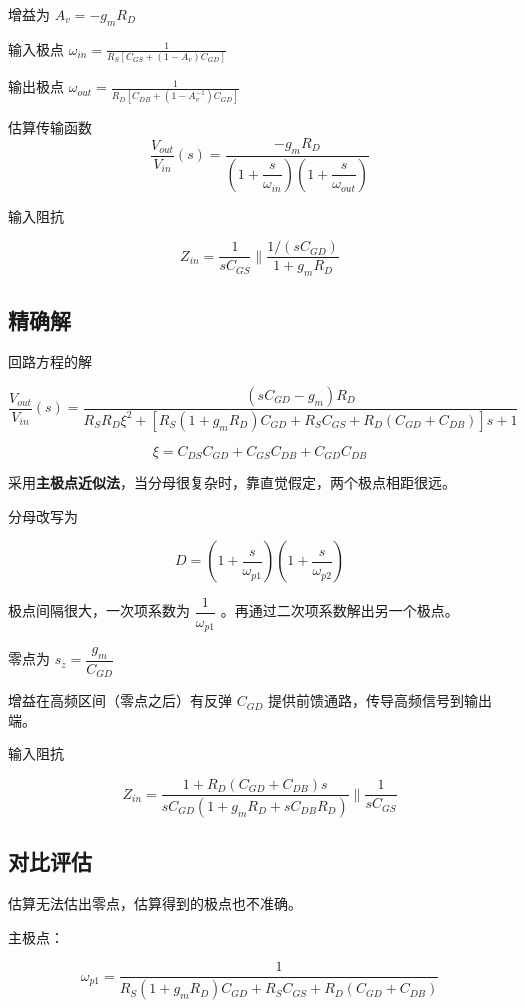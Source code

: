 \documentclass[cn,11pt,chinese,black,simple]{../elegantbook}
\begin{document}
增益为 \(A_v = - g_m R_D\) 

输入极点 \(\omega_{in} = \frac{1}{R_S [C_{GS} + (1 - A_v) C_{GD}]}\)

输出极点 \(\omega_{out} = \frac{1}{R_D [C_{DB} + (1 - A_v^{-1}) C_{GD}]}\)

估算传输函数 \[\frac{V_{out}}{V_{in}}(s) = \frac{-g_m R_D}{(1 + \dfrac{s}{\omega_{in}}) (1 + \dfrac{s}{\omega_{out}})}\]


输入阻抗

\[Z_{in} = \frac{1}{s C_{GS}} \| \frac{1/ (s C_{GD})}{1 + g_m R_D}\]

\subsection{精确解}

回路方程的解

\[\frac{V_{out}}{V_{in}}(s) = \frac{(s C_{GD} - g_m)R_D}{R_S R_D \xi^2 + [R_S(1 + g_m R_D) C_{GD} + R_S C_{GS} +R_D(C_{GD} + C_{DB} )]s + 1}\]

\[\xi = C_{DS} C_{GD} + C_{GS} C_{DB} + C_{GD} C_{DB}\]

采用\textbf{主极点近似法}，当分母很复杂时，靠直觉假定，两个极点相距很远。

分母改写为 

\[D = (1 + \frac{s}{\omega_{p1}})(1 + \frac{s}{\omega_{p2}})\]

极点间隔很大，一次项系数为 \(\dfrac{1}{\omega_{p1}}\) 。再通过二次项系数解出另一个极点。

零点为 \(s_z = \dfrac{g_m}{C_{GD}}\)

增益在高频区间（零点之后）有反弹 \(C_{GD}\) 提供前馈通路，传导高频信号到输出端。


输入阻抗

\[Z_{in} = \frac{1 + R_D (C_{GD} + C_{DB })s}{s C_{GD} (1 + g_m R_D + s C_{DB} R_D)} \| \frac{1}{s C_{GS}}\]



\subsection{对比评估}

估算无法估出零点，估算得到的极点也不准确。

主极点：

\[\omega_{p1} = \frac{1}{R_S(1 + g_m R_D) C_{GD} + R_S C_{GS} + R_D(C_{GD} + C_{DB})}\]
\end{document}
